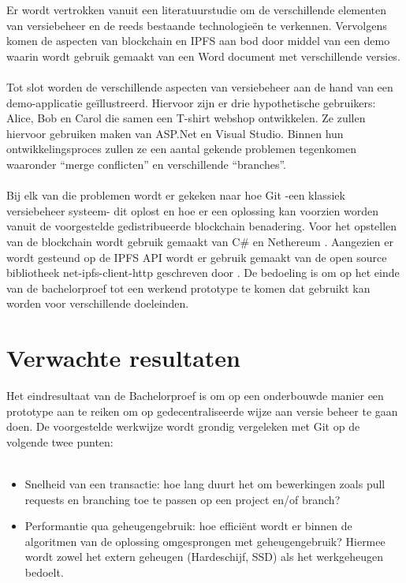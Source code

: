 Er wordt vertrokken vanuit een literatuurstudie om de verschillende elementen van versiebeheer en de reeds bestaande technologieën te verkennen. Vervolgens komen de aspecten van blockchain en IPFS aan bod door middel van een demo waarin wordt gebruik gemaakt van een Word document met verschillende versies.\\\\
Tot slot worden de verschillende aspecten van versiebeheer aan de hand van een demo-applicatie geïllustreerd. Hiervoor zijn er drie hypothetische gebruikers: Alice, Bob en Carol die samen een T-shirt webshop ontwikkelen. Ze zullen hiervoor gebruiken maken van ASP.Net en Visual Studio. Binnen hun ontwikkelingsproces zullen ze een aantal gekende problemen tegenkomen waaronder “merge conflicten” en verschillende “branches”.\\\\
Bij elk van die problemen wordt er gekeken naar hoe Git -een klassiek versiebeheer systeem- dit oplost en hoe er een oplossing kan voorzien worden vanuit de voorgestelde gedistribueerde blockchain benadering. Voor het opstellen van de blockchain wordt gebruik gemaakt van C\# en Nethereum \autocite{Nethereum}. Aangezien er wordt gesteund op de IPFS API wordt er gebruik gemaakt van de open source bibliotheek net-ipfs-client-http geschreven door \textcite{IPFSClient}. De bedoeling is om op het einde van de bachelorproef tot een werkend prototype te komen dat gebruikt kan worden voor verschillende doeleinden.

\section{Verwachte resultaten}
\label{sec:verwachte_resultaten}

Het eindresultaat van de Bachelorproef is om op een onderbouwde manier een prototype aan te reiken om op gedecentraliseerde wijze aan versie beheer te gaan doen. De voorgestelde werkwijze wordt grondig vergeleken met Git op de volgende twee punten:\\\\

\begin{itemize}
\item Snelheid van een transactie: hoe lang duurt het om bewerkingen zoals pull requests en branching toe te passen op een project en/of branch?
\item Performantie qua geheugengebruik: hoe efficiënt wordt er binnen de algoritmen van de oplossing omgesprongen met geheugengebruik? Hiermee wordt zowel het extern geheugen (Hardeschijf, SSD) als het werkgeheugen bedoelt.\\\\
\end{itemize}

